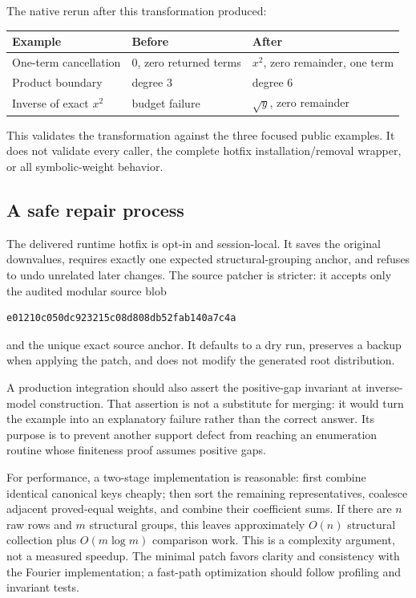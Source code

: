 \documentclass[11pt,letterpaper]{article}
\begin{document}
The native rerun after this transformation produced:
\begin{center}
\begin{tabularx}{\linewidth}{@{}lXX@{}}
\toprule
Example & Before & After\\\midrule
One-term cancellation & $0$, zero returned terms & $x^2$, zero remainder, one term\\
Product boundary & degree $3$ & degree $6$\\
Inverse of exact $x^2$ & budget failure & $\sqrt y$, zero remainder\\\bottomrule
\end{tabularx}
\end{center}
This validates the transformation against the three focused public examples. It does not validate every caller, the complete hotfix installation/removal wrapper, or all symbolic-weight behavior.

\subsection{A safe repair process}
The delivered runtime hotfix is opt-in and session-local. It saves the original downvalues, requires exactly one expected structural-grouping anchor, and refuses to undo unrelated later changes. The source patcher is stricter: it accepts only the audited modular source blob
\begin{lstlisting}
e01210c050dc923215c08d808db52fab140a7c4a
\end{lstlisting}
and the unique exact source anchor. It defaults to a dry run, preserves a backup when applying the patch, and does not modify the generated root distribution.

A production integration should also assert the positive-gap invariant at inverse-model construction. That assertion is not a substitute for merging: it would turn the example into an explanatory failure rather than the correct answer. Its purpose is to prevent another support defect from reaching an enumeration routine whose finiteness proof assumes positive gaps.

For performance, a two-stage implementation is reasonable: first combine identical canonical keys cheaply; then sort the remaining representatives, coalesce adjacent proved-equal weights, and combine their coefficient sums. If there are $n$ raw rows and $m$ structural groups, this leaves approximately $O(n)$ structural collection plus $O(m\log m)$ comparison work. This is a complexity argument, not a measured speedup. The minimal patch favors clarity and consistency with the Fourier implementation; a fast-path optimization should follow profiling and invariant tests.
\end{document}
